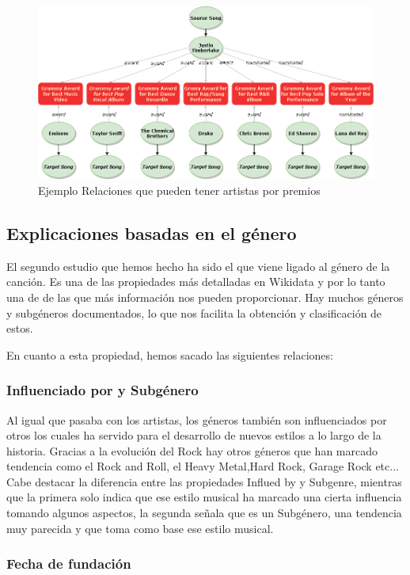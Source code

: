 \begin{figure}[h!]
	\centering
	\includegraphics[width = 1\textwidth]{Imagenes/Bitmap/awads.png}
	\caption{Ejemplo Relaciones que pueden tener artistas por premios}
	\label{fig:sampleImage}
\end{figure}


\subsection{Explicaciones basadas en el género}
El segundo estudio que hemos hecho ha sido el que viene ligado al género de la canción. Es una de las propiedades más detalladas en Wikidata y por lo tanto una de de las que más información nos pueden proporcionar. Hay muchos géneros y subgéneros documentados, lo que nos facilita la obtención y clasificación de estos.

En cuanto a esta propiedad, hemos sacado las siguientes relaciones:

\subsubsection*{Influenciado por y Subgénero}
Al igual que pasaba con los artistas, los géneros también son influenciados por otros los cuales ha servido para el desarrollo de nuevos estilos a lo largo de la historia. Gracias a la evolución del Rock hay otros géneros que han marcado tendencia como el Rock and Roll, el Heavy Metal,Hard Rock, Garage Rock etc...
Cabe destacar la diferencia entre las propiedades Influed by y Subgenre, mientras que la primera solo indica que ese estilo musical ha marcado una cierta influencia tomando algunos aspectos, la segunda señala que es un Subgénero, una tendencia muy parecida y que toma como base ese estilo musical.

\subsubsection*{Fecha de fundación}

